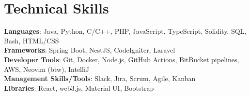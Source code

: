\documentclass[letterpaper,11pt]{article}
\begin{document}
\section{Technical Skills}
 \begin{itemize}[leftmargin=0.15in, label={}]
    \small{\item{
     \textbf{Languages}{: Java, Python, C/C++, PHP, JavaScript, TypeScript, Solidity, SQL, Bash, HTML/CSS} \\
     \textbf{Frameworks}{: Spring Boot, NestJS, CodeIgniter, Laravel} \\
     \textbf{Developer Tools}{: Git, Docker, Node.js, GitHub Actions, BitBucket pipelines, AWS, Neovim (btw), IntelliJ} \\
     \textbf{Management Skills/Tools}{: Slack, Jira, Scrum, Agile, Kanban} \\
     \textbf{Libraries}{: React, web3.js, Material UI, Bootstrap}
    }}
 \end{itemize}


\end{document}
